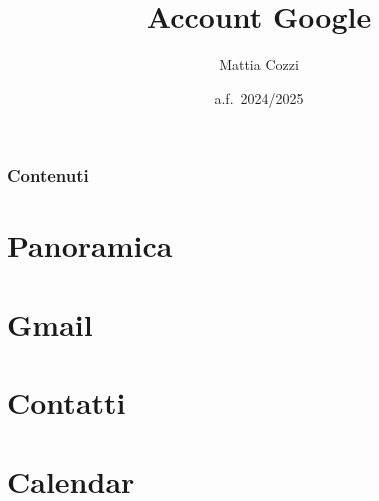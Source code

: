 \documentclass[handout]{beamer}
\title{Account Google}
\author{Mattia Cozzi}
\date{a.f.~2024/2025}
\begin{document}
\begin{frame}
  \titlepage
\end{frame}


\begin{frame}
\frametitle{Contenuti}
\tableofcontents
\end{frame}



\section{Panoramica}


\begin{frame}
\frametitle{}

\end{frame}




\section{Gmail}

\begin{frame}
\frametitle{}

\end{frame}



\section{Contatti}

\begin{frame}
\frametitle{}

\end{frame}


\section{Calendar}
\end{document}
